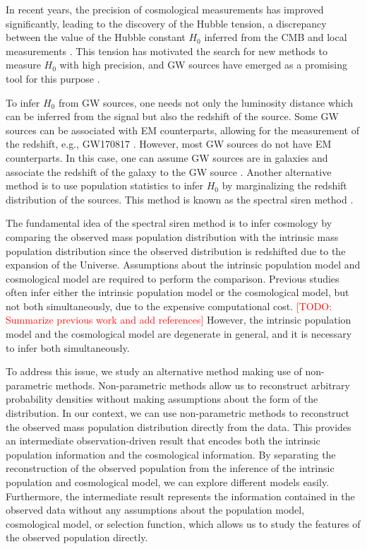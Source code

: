 \documentclass[twocolumn]{aastex631}
\newcommand{\todo}[1]{\textcolor{red}{[TODO: #1]}}
\begin{document}
In recent years, the precision of cosmological measurements has improved significantly, leading to the discovery of the Hubble tension, a discrepancy between the value of the Hubble constant $H_0$ inferred from the \ac{CMB} \citep{Planck:2018vyg} and local measurements \citep{Riess:2021jrx}.
This tension has motivated the search for new methods to measure $H_0$ with high precision, and \ac{GW} sources have emerged as a promising tool for this purpose \citep{LIGOScientific:2017adf, LIGOScientific:2021aug, Ezquiaga:2022zkx}.

To infer $H_0$ from \ac{GW} sources, one needs not only the luminosity distance which can be inferred from the signal but also the redshift of the source.
Some \ac{GW} sources can be associated with \ac{EM} counterparts, allowing for the measurement of the redshift, e.g., GW170817 \citep{LIGOScientific:2017adf, Guidorzi:2017ogy}.
However, most \ac{GW} sources do not have \ac{EM} counterparts.
In this case, one can assume \ac{GW} sources are in galaxies and associate the redshift of the galaxy to the \ac{GW} source \citep{Schutz:1986gp, DelPozzo:2011vcw, Gray:2019ksv, Gray:2023wgj}.
Another alternative method is to use population statistics to infer $H_0$ by marginalizing the redshift distribution of the sources.
This method is known as the spectral siren method \citep{You:2020wju, Mastrogiovanni:2021wsd, LIGOScientific:2021aug, Ezquiaga:2022zkx}.

The fundamental idea of the spectral siren method is to infer cosmology by comparing the observed mass population distribution with the intrinsic mass population distribution since the observed distribution is redshifted due to the expansion of the Universe.
Assumptions about the intrinsic population model and cosmological model are required to perform the comparison.
Previous studies often infer either the intrinsic population model or the cosmological model, but not both simultaneously, due to the expensive computational cost.
\todo{Summarize previous work and add references}
However, the intrinsic population model and the cosmological model are degenerate in general, and it is necessary to infer both simultaneously.

To address this issue, we study an alternative method making use of non-parametric methods.
Non-parametric methods allow us to reconstruct arbitrary probability densities without making assumptions about the form of the distribution.
In our context, we can use non-parametric methods to reconstruct the observed mass population distribution directly from the data.
This provides an intermediate observation-driven result that encodes both the intrinsic population information and the cosmological information.
By separating the reconstruction of the observed population from the inference of the intrinsic population and cosmological model, we can explore different models easily.
Furthermore, the intermediate result represents the information contained in the observed data without any assumptions about the population model, cosmological model, or selection function, which allows us to study the features of the observed population directly.
\end{document}
